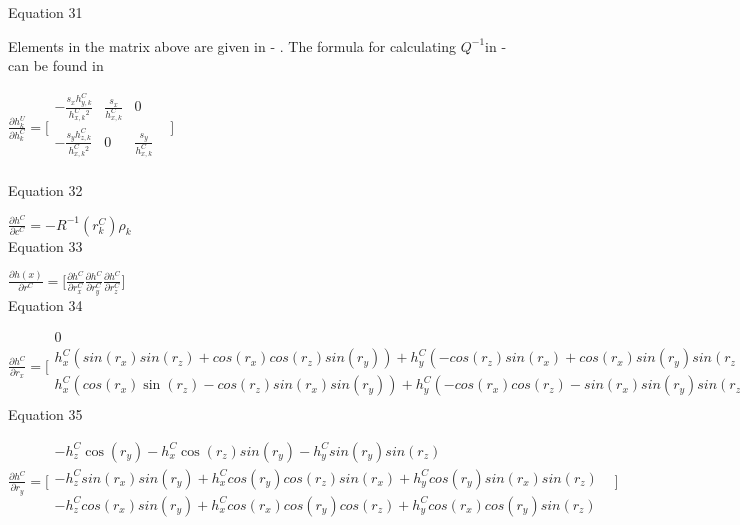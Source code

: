 Equation 31

Elements in the matrix above are given in - . The formula for 
calculating $Q^{-1}$in - can be found in 

\begin{center}$\frac{\partial h_{k}^{U}}{\partial h_{ k}^{C}}= \lbrack 
\begin{matrix}
-\frac{s_{x}h_{y,k}^{C}}{h_{x,k}^{C}^{2}} & \frac{s_{x}}{h_{x,k}^{C}} & 
0 & \\
-\frac{s_{y}h_{z,k}^{C}}{h_{x,k}^{C}^{2}} & 0 & 
\frac{s_{y}}{h_{x,k}^{C}} & \\
\end{matrix}
\rbrack $\\
\end{center}

Equation 32



$\frac{\partial h^{C}}{\partial c^{C}}=-R^{-1}(r_{k}^{C})\rho _{k}$\\


Equation 33

$\frac{\partial h(x)}{\partial r^{C}}=\lbrack \frac{\partial 
h^{C}}{\partial r_{x}^{C}}\frac{\partial h^{C}}{\partial 
r_{y}^{C}}\frac{\partial h^{C}}{\partial r_{z}^{C}}\rbrack $\\


Equation 34

$\frac{\partial h^{C}}{\partial r_{x}}=\lbrack \begin{matrix}
0 & \\

h_{x}^{C}(sin(r_{x})sin(r_{z})+cos(r_{x})cos(r_{z})sin(r_{y}))+h_{y}^{C}(-cos(r_{z})sin(r_{x})+cos(r_{x})sin(r_{y})sin(r_{z})) 
+ h_{z}^{C}cos(r_{x})cos(r_{y}) & \\
h_{x}^{C}(cos(r_{x})\sin 
(r_{z})-cos(r_{z})sin(r_{x})sin(r_{y}))+h_{y}^{C}(-cos(r_{x})cos(r_{z})-sin(r_{x})sin(r_{y})sin(r_{z})) 
- h_{z}^{C}cos(r_{y})sin(r_{x}) & \\
\end{matrix}
\rbrack $\\


Equation 35

$\frac{\partial h^{C}}{\partial r_{y}}=\lbrack \begin{matrix}
-h_{z}^{C}\cos (r_{y})- h_{x}^{C}\cos (r_{z})sin(r_{y})- 
h_{y}^{C}sin(r_{y})sin(r_{z}) & \\

-h_{z}^{C}sin(r_{x})sin(r_{y})+h_{x}^{C}cos(r_{y})cos(r_{z})sin(r_{x})+h_{y}^{C}cos(r_{y})sin(r_{x})sin(r_{z}) 
& \\

-h_{z}^{C}cos(r_{x})sin(r_{y})+h_{x}^{C}cos(r_{x})cos(r_{y})cos(r_{z})+h_{y}^{C}cos(r_{x})cos(r_{y})sin(r_{z}) 
& \\
\end{matrix}
\rbrack $\\


